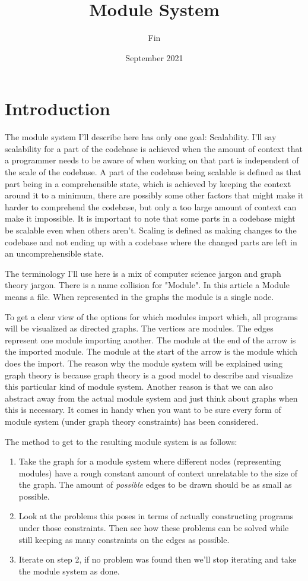 \documentclass{article}
\title{Module System}
\author{Fin}
\date{September 2021}
\begin{document}
\maketitle

\section{Introduction}
The module system I'll describe here has only one goal: Scalability.
I'll say scalability for a part of the codebase is achieved when the amount of context that a programmer needs to be aware of when working on that part is independent of the scale of the codebase.
A part of the codebase being scalable is defined as that part being in a comprehensible state, which is achieved by keeping the context around it to a minimum, there are possibly some other factors that might make it harder to comprehend the codebase, but only a too large amount of context can make it impossible.
It is important to note that some parts in a codebase might be scalable even when others aren't.
Scaling is defined as making changes to the codebase and not ending up with a codebase where the changed parts are left in an uncomprehensible state.

The terminology I'll use here is a mix of computer science jargon and graph theory jargon. There is a name collision for "Module". In this article a Module means a file. When represented in the graphs the module is a single node.

To get a clear view of the options for which modules import which, all programs will be visualized as directed graphs. 
The vertices are modules.
The edges represent one module importing another.
The module at the end of the arrow is the imported module. 
The module at the start of the arrow is the module which does the import. 
The reason why the module system will be explained using graph theory is because graph theory is a good model to describe and visualize this particular kind of module system. Another reason is that we can also abstract away from the actual module system and just think about graphs when this is necessary. It comes in handy when you want to be sure every form of module system (under graph theory constraints) has been considered.


The method to get to the resulting module system is as follows:

\begin{enumerate}
    \item Take the graph for a module system where different nodes
(representing modules) have a rough constant amount of context unrelatable to the size of the graph. The amount of \emph{possible} edges to be drawn should be as small as possible.

    \item Look at the problems this poses in terms of actually constructing programs under those constraints. Then see how these problems can be solved while still keeping as many constraints on the edges as possible.
    
    \item Iterate on step 2, if no problem was found then we’ll stop iterating and take the module system as done.
\end{enumerate}
\end{document}
